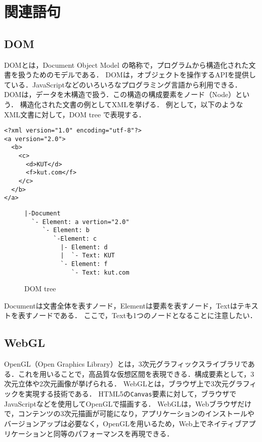 \section{関連語句}
\subsection{DOM}
DOMとは，Document Object Model の略称で，プログラムから構造化された文書を扱うためのモデルである．
DOMは，オブジェクトを操作するAPIを提供している．JavaScriptなどのいろいろなプログラミング言語から利用できる．
DOMは，データを木構造で扱う．この構造の構成要素をノード（Node）という．
構造化された文書の例としてXMLを挙げる．
例として，以下のようなXML文書に対して，DOM tree で表現する．
\begin{lstlisting}[caption={XML文書}]
<?xml version="1.0" encoding="utf-8"?>
<a version="2.0">
  <b>
    <c>
      <d>KUT</d>
      <f>kut.com</f>
    </c>
  </b>
</a>
\end{lstlisting}
\begin{figure}[H]
    \begin{framed}
        \centering
        \begin{verbatim}
|-Document
  `- Element: a vertion="2.0"
     `- Element: b
        `-Element: c
          |- Element: d
          |  `- Text: KUT
          `- Element: f   
             `- Text: kut.com
\end{verbatim}
    \end{framed}
    \caption{DOM tree}
\end{figure}
Documentは文書全体を表すノード，Elementは要素を表すノード，Textはテキストを表すノードである．
ここで，Textも1つのノードとなることに注意したい．
\\\hfill\cite{XML文書とDOM}
\subsection{WebGL}
OpenGL（Open Graphics Library）とは，3次元グラフィックスライブラリである．これを用いることで，高品質な仮想区間を表現できる．構成要素として，3次元立体や2次元画像が挙げられる\cite{OpenGL入門}．
WebGLとは，ブラウザ上で3次元グラフィックを実現する技術である．
HTML5の\texttt{Canvas}要素に対して，ブラウザでJavaScriptなどを使用してOpenGLで描画する．
WebGLは，Webブラウザだけで，コンテンツの3次元描画が可能になり，アプリケーションのインストールやバージョンアップは必要なく，OpenGLを用いるため，Web上でネイティブアプリケーションと同等のパフォーマンスを再現できる．
\\\hfill\cite{webglみずほ}
